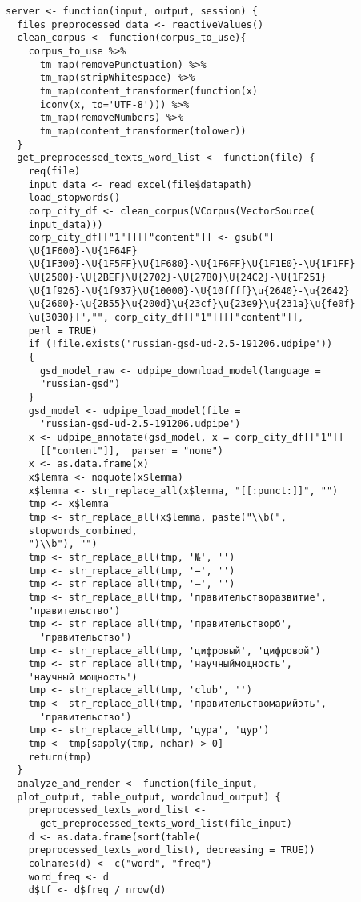 \documentclass[bachelor, och, diploma ]{SCWorks}
\begin{document}
\begin{verbatim}
server <- function(input, output, session) {
  files_preprocessed_data <- reactiveValues()
  clean_corpus <- function(corpus_to_use){
    corpus_to_use %>%
      tm_map(removePunctuation) %>%
      tm_map(stripWhitespace) %>%
      tm_map(content_transformer(function(x) 
      iconv(x, to='UTF-8'))) %>%
      tm_map(removeNumbers) %>%
      tm_map(content_transformer(tolower)) 
  }
  get_preprocessed_texts_word_list <- function(file) {
    req(file)
    input_data <- read_excel(file$datapath)
    load_stopwords()
    corp_city_df <- clean_corpus(VCorpus(VectorSource(
    input_data)))
    corp_city_df[["1"]][["content"]] <- gsub("[
    \U{1F600}-\U{1F64F}
    \U{1F300}-\U{1F5FF}\U{1F680}-\U{1F6FF}\U{1F1E0}-\U{1F1FF}
    \U{2500}-\U{2BEF}\U{2702}-\U{27B0}\U{24C2}-\U{1F251}
    \U{1f926}-\U{1f937}\U{10000}-\U{10ffff}\u{2640}-\u{2642}
    \u{2600}-\u{2B55}\u{200d}\u{23cf}\u{23e9}\u{231a}\u{fe0f}
    \u{3030}]","", corp_city_df[["1"]][["content"]], 
    perl = TRUE)
    if (!file.exists('russian-gsd-ud-2.5-191206.udpipe'))
    {
      gsd_model_raw <- udpipe_download_model(language = 
      "russian-gsd")
    }
    gsd_model <- udpipe_load_model(file =
      'russian-gsd-ud-2.5-191206.udpipe')
    x <- udpipe_annotate(gsd_model, x = corp_city_df[["1"]]
      [["content"]],  parser = "none")
    x <- as.data.frame(x)
    x$lemma <- noquote(x$lemma)
    x$lemma <- str_replace_all(x$lemma, "[[:punct:]]", "")
    tmp <- x$lemma
    tmp <- str_replace_all(x$lemma, paste("\\b(", 
    stopwords_combined,
    ")\\b"), "")
    tmp <- str_replace_all(tmp, '№', '')
    tmp <- str_replace_all(tmp, '−', '')
    tmp <- str_replace_all(tmp, '—', '')
    tmp <- str_replace_all(tmp, 'правительстворазвитие', 
    'правительство')
    tmp <- str_replace_all(tmp, 'правительстворб', 
      'правительство')
    tmp <- str_replace_all(tmp, 'цифровый', 'цифровой')
    tmp <- str_replace_all(tmp, 'научныймощность', 
    'научный мощность')
    tmp <- str_replace_all(tmp, 'club', '')
    tmp <- str_replace_all(tmp, 'правительствомарийэть', 
      'правительство')
    tmp <- str_replace_all(tmp, 'цура', 'цур')
    tmp <- tmp[sapply(tmp, nchar) > 0]
    return(tmp)
  }
  analyze_and_render <- function(file_input, 
  plot_output, table_output, wordcloud_output) {
    preprocessed_texts_word_list <- 
      get_preprocessed_texts_word_list(file_input)
    d <- as.data.frame(sort(table(
    preprocessed_texts_word_list), decreasing = TRUE))
    colnames(d) <- c("word", "freq")
    word_freq <- d
    d$tf <- d$freq / nrow(d)

\end{verbatim}
\end{document}
